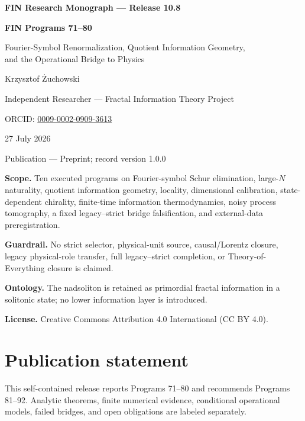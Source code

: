 \documentclass[11pt,a4paper,openany]{report}
\begin{document}
\hypersetup{pageanchor=false}
\begin{titlepage}
\centering
\vspace*{8mm}
{\Large\bfseries FIN Research Monograph --- Release 10.8\par}
\vspace{10mm}
{\Huge\bfseries FIN Programs 71--80\par}
\vspace{6mm}
{\Large Fourier-Symbol Renormalization, Quotient Information Geometry,\\
and the Operational Bridge to Physics\par}
\vspace{16mm}
{\Large Krzysztof \.Zuchowski\par}
\vspace{2mm}
{\normalsize Independent Researcher --- Fractal Information Theory Project\par}
\vspace{2mm}
{\normalsize ORCID: \href{https://orcid.org/0009-0002-0909-3613}{0009-0002-0909-3613}\par}
\vspace{9mm}
{\large 27 July 2026\par}
{\normalsize Publication --- Preprint; record version 1.0.0\par}
\vfill
\begin{minipage}{0.88\textwidth}
\small
\textbf{Scope.} Ten executed programs on Fourier-symbol Schur elimination,
large-\(N\) naturality, quotient information geometry, locality, dimensional
calibration, state-dependent chirality, finite-time information
thermodynamics, noisy process tomography, a fixed legacy--strict bridge
falsification, and external-data preregistration.

\medskip
\textbf{Guardrail.} No strict selector, physical-unit source, causal/Lorentz
closure, legacy physical-role transfer, full legacy--strict completion, or
Theory-of-Everything closure is claimed.

\medskip
\textbf{Ontology.} The nadsoliton is retained as primordial fractal
information in a solitonic state; no lower information layer is introduced.

\medskip
\textbf{License.} Creative Commons Attribution 4.0 International (CC BY 4.0).
\end{minipage}
\vfill
\end{titlepage}
\hypersetup{pageanchor=true}

\chapter*{Publication statement}
This self-contained release reports Programs 71--80 and recommends Programs
81--92. Analytic theorems, finite numerical evidence, conditional operational
models, failed bridges, and open obligations are labeled separately.
\end{document}
